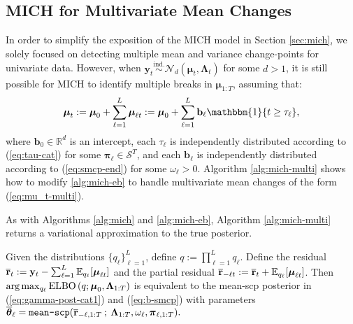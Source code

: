 \subsection{MICH for Multivariate Mean Changes}
\label{app:multi-mich}

In order to simplify the exposition of the MICH model in Section \ref{sec:mich}, we solely focused on detecting multiple mean and variance change-points for univariate data. However, when $\mathbf{y}_{t} \overset{\text{ind}.}{\sim}\mathcal{N}_d(\boldsymbol{\mu}_t,\boldsymbol{\Lambda}_t)$ for some $d>1$, it is still possible for MICH to identify multiple breaks in $\boldsymbol{\mu}_{1:T}$, assuming that: 
\begin{align}
    \boldsymbol{\mu}_{t} :=  \boldsymbol{\mu}_0+ \sum_{\ell = 1}^L \boldsymbol{\mu}_{\ell t}:= \boldsymbol{\mu}_0+ \sum_{\ell = 1}^L \mathbf{b}_\ell\mathbbm{1}\{t \geq\tau_\ell\}, \label{eq:mu_t-multi}
\end{align}
where $\mathbf{b}_0 \in \mathbb{R}^d$ is an intercept, each $\tau_\ell$ is independently distributed according to (\ref{eq:tau-cat}) for some $\boldsymbol{\pi}_\ell \in \mathcal{S}^T$, and each $\mathbf{b}_\ell$ is independently distributed according to (\ref{eq:smcp-end}) for some $\omega_\ell > 0 $. Algorithm \ref{alg:mich-multi} shows how to modify \ref{alg:mich-eb} to handle multivariate mean changes of the form (\ref{eq:mu_t-multi}).



As with Algorithms \ref{alg:mich} and \ref{alg:mich-eb}, Algorithm \ref{alg:mich-multi} returns a variational approximation to the true posterior.  

\begin{proposition} 
\label{prop:vb-multi}
Given the distributions $\{q_\ell\}_{\ell=1}^L$, define $q:=\prod_{\ell=1}^Lq_\ell$. Define the residual $\overline{\mathbf{r}}_t := \mathbf{y}_t - \sum_{\ell=1}^L \mathbb{E}_{q_\ell}[\boldsymbol{\mu}_{\ell t}]$ and the partial residual $\overline{\mathbf{r}}_{-\ell t} := \overline{\mathbf{r}}_t + \mathbb{E}_{q_\ell}[\boldsymbol{\mu}_{\ell t}]$. Then $\text{\normalfont{arg}}\max_{q_\ell} \text{\normalfont ELBO}\left(q;\boldsymbol{\mu}_0,\boldsymbol{\Lambda}_{1:T}\right)$ is equivalent to the mean-scp posterior in (\ref{eq:gamma-post-cat1}) and (\ref{eq:b-smcp}) with parameters $\overline{\boldsymbol{\theta}}_\ell = \normalfont{\texttt{mean-scp}}(\overline{\mathbf{r}}_{-\ell,1:T} \:;\: \boldsymbol{\Lambda}_{1:T}, \omega_{\ell}, \boldsymbol{\pi}_{\ell,1:T}).$ 
\end{proposition}

